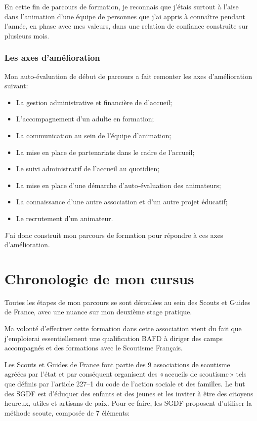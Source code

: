\documentclass[titlepage,11pt,a4paper]{article}
\begin{document}
En cette fin de parcours de formation, je reconnais que j'étais surtout à l'aise dans
l'animation d'une équipe de personnes que j'ai appris à connaître pendant l'année,
en phase avec mes valeurs, dans une relation de confiance construite sur plusieurs mois.

\subsubsection{Les axes d'amélioration}

Mon auto-évaluation de début de parcours a fait remonter les axes d'amélioration suivant:

\begin{itemize}
   \item La gestion administrative et financière de d'accueil;
   \item L'accompagnement d'un adulte en formation;
   \item La communication au sein de l'équipe d'animation;
   \item La mise en place de partenariats dans le cadre de l'accueil;
   \item Le suivi administratif de l'accueil au quotidien;
   \item La mise en place d'une démarche d'auto-évaluation des animateurs;
   \item La connaissance d'une autre association et d'un autre projet éducatif;
   \item Le recrutement d'un animateur.
\end{itemize}

J'ai donc construit mon parcours de formation pour répondre à ces axes d'amélioration.

\section{Chronologie de mon cursus}

Toutes les étapes de mon parcours se sont déroulées au sein des Scouts et Guides de
France, avec une nuance sur mon deuxième stage pratique.

Ma volonté d'effectuer cette formation dans cette association vient du fait que
j'emploierai essentiellement une qualification BAFD à diriger des camps accompagnés
et des formations avec le Scoutisme Français.

Les Scouts et Guides de France font partie des 9 associations de scoutisme agréées par
l'état et par conséquent organisent des «\,accueils de scoutisme\,» tels que définis par
l'article 227--1 du code de l'action sociale et des familles. Le but des SGDF est d'éduquer
des enfants et des jeunes et les inviter à être des citoyens heureux, utiles et artisans
de paix. Pour ce faire, les SGDF proposent d'utiliser la méthode scoute, composée de 7
éléments:\label{methsc}
\end{document}
